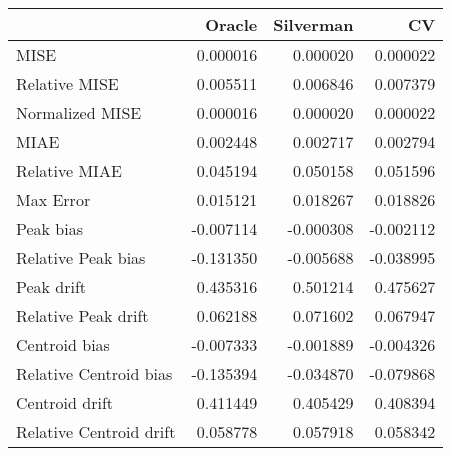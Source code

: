 \begin{tabular}{lrrr}
  \hline
 & Oracle & Silverman & CV \\ 
  \hline
MISE & 0.000016 & 0.000020 & 0.000022 \\ 
  Relative MISE & 0.005511 & 0.006846 & 0.007379 \\ 
  Normalized MISE & 0.000016 & 0.000020 & 0.000022 \\ 
  MIAE & 0.002448 & 0.002717 & 0.002794 \\ 
  Relative MIAE & 0.045194 & 0.050158 & 0.051596 \\ 
  Max Error & 0.015121 & 0.018267 & 0.018826 \\ 
  Peak bias & -0.007114 & -0.000308 & -0.002112 \\ 
  Relative Peak bias & -0.131350 & -0.005688 & -0.038995 \\ 
  Peak drift & 0.435316 & 0.501214 & 0.475627 \\ 
  Relative Peak drift & 0.062188 & 0.071602 & 0.067947 \\ 
  Centroid bias & -0.007333 & -0.001889 & -0.004326 \\ 
  Relative Centroid bias & -0.135394 & -0.034870 & -0.079868 \\ 
  Centroid drift & 0.411449 & 0.405429 & 0.408394 \\ 
  Relative Centroid drift & 0.058778 & 0.057918 & 0.058342 \\ 
   \hline
\end{tabular}
